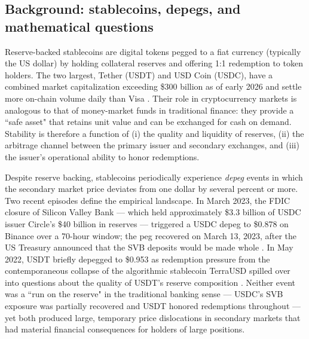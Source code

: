 \documentclass[11pt,a4paper]{article}
\theoremstyle{plain}
\theoremstyle{definition}
\begin{document}
\subsection{Background: stablecoins, depegs, and mathematical questions}

Reserve-backed stablecoins are digital tokens pegged to a fiat currency (typically the US dollar) by holding collateral reserves and offering 1:1 redemption to token holders.
The two largest, Tether (USDT) and USD Coin (USDC), have a combined market capitalization exceeding \$300 billion as of early 2026 and settle more on-chain volume daily than Visa \cite{MohantyKrishnamachari2026, GortonZhang2023}.
Their role in cryptocurrency markets is analogous to that of money-market funds in traditional finance: they provide a ``safe asset" that retains unit value and can be exchanged for cash on demand.
Stability is therefore a function of (i) the quality and liquidity of reserves, (ii) the arbitrage channel between the primary issuer and secondary exchanges, and (iii) the issuer's operational ability to honor redemptions.

Despite reserve backing, stablecoins periodically experience \emph{depeg} events in which the secondary market price deviates from one dollar by several percent or more.
Two recent episodes define the empirical landscape.
In March 2023, the FDIC closure of Silicon Valley Bank --- which held approximately \$3.3 billion of USDC issuer Circle's \$40 billion in reserves --- triggered a USDC depeg to \$0.878 on Binance over a 70-hour window; the peg recovered on March 13, 2023, after the US Treasury announced that the SVB deposits would be made whole \cite{LyonsViswanathNatraj2023, MohantyKrishnamachari2026}.
In May 2022, USDT briefly depegged to \$0.953 as redemption pressure from the contemporaneous collapse of the algorithmic stablecoin TerraUSD spilled over into questions about the quality of USDT's reserve composition \cite{KlagesMundtMinca2022}.
Neither event was a ``run on the reserve" in the traditional banking sense --- USDC's SVB exposure was partially recovered and USDT honored redemptions throughout --- yet both produced large, temporary price dislocations in secondary markets that had material financial consequences for holders of large positions.
\end{document}
